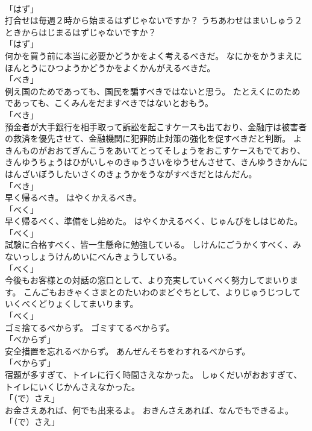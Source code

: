 \documentclass[8pt]{extreport}
\begin{document}
\begin{CJK}{UTF8}{min}
\\	「はず」 
\\	打合せは毎週２時から始まるはずじゃないですか？	うちあわせはまいしゅう２ときからはじまるはずじゃないですか？	
\\	「はず」 
\\	何かを買う前に本当に必要かどうかをよく考えるべきだ。	なにかをかうまえにほんとうにひつようかどうかをよくかんがえるべきだ。	
\\	「べき」 
\\	例え国のためであっても、国民を騙すべきではないと思う。	たとえくにのためであっても、こくみんをだますべきではないとおもう。	
\\	「べき」 
\\	預金者が大手銀行を相手取って訴訟を起こすケースも出ており、金融庁は被害者の救済を優先させて、金融機関に犯罪防止対策の強化を促すべきだと判断。	よきんものがおおてぎんこうをあいてとってそしょうをおこすケースもでており、きんゆうちょうはひがいしゃのきゅうさいをゆうせんさせて、きんゆうきかんにはんざいぼうしたいさくのきょうかをうながすべきだとはんだん。	
\\	「べき」 
\\	早く帰るべき。	はやくかえるべき。	
\\	「べく」 
\\	早く帰るべく、準備をし始めた。	はやくかえるべく、じゅんびをしはじめた。	
\\	「べく」 
\\	試験に合格すべく、皆一生懸命に勉強している。	しけんにごうかくすべく、みないっしょうけんめいにべんきょうしている。	
\\	「べく」 
\\	今後もお客様との対話の窓口として、より充実していくべく努力してまいります。	こんごもおきゃくさまとのたいわのまどぐちとして、よりじゅうじつしていくべくどりょくしてまいります。	
\\	「べく」 
\\	ゴミ捨てるべからず。	ゴミすてるべからず。	
\\	「べからず」 
\\	安全措置を忘れるべからず。	あんぜんそちをわすれるべからず。	
\\	「べからず」 
\\	宿題が多すぎて、トイレに行く時間さえなかった。	しゅくだいがおおすぎて、トイレにいくじかんさえなかった。	
\\	「（で）さえ」 
\\	お金さえあれば、何でも出来るよ。	おきんさえあれば、なんでもできるよ。	
\\	「（で）さえ」 

\end{CJK}
\end{document}
